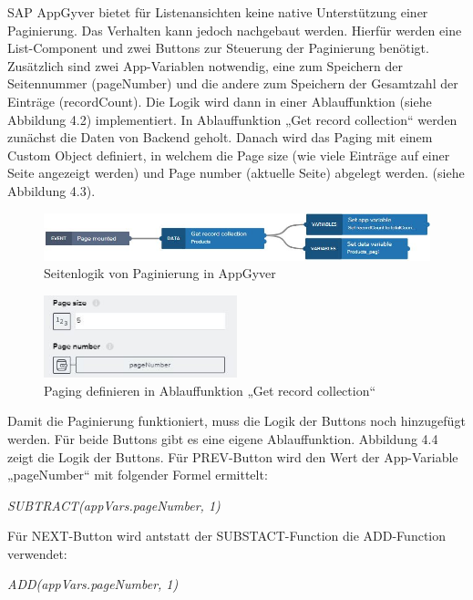 SAP AppGyver bietet für Listenansichten keine native Unterstützung einer Paginierung. Das Verhalten kann jedoch nachgebaut werden. Hierfür werden eine List-Component und zwei Buttons zur Steuerung der Paginierung benötigt. Zusätzlich sind zwei App-Variablen notwendig, eine zum Speichern der Seitennummer (pageNumber) und die andere zum Speichern der Gesamtzahl der Einträge (recordCount). Die Logik wird dann in einer Ablauffunktion (siehe Abbildung 4.2) implementiert. In Ablauffunktion „Get record collection“ werden zunächst die Daten von Backend geholt. Danach wird das Paging mit einem Custom Object definiert, in welchem die Page size (wie viele Einträge auf einer Seite angezeigt werden) und Page number  (aktuelle Seite) abgelegt werden. (siehe Abbildung 4.3).

\begin{figure}[htbp]
 \centering
 \includegraphics[width=1.0\textwidth]{Bilder/appgyver/4_2_Seitenlogic paginierung.jpg}
 \caption{Seitenlogik von Paginierung in AppGyver}
\end{figure}
 
\begin{figure}[htbp]
 \centering
 \includegraphics[width=0.5\textwidth]{Bilder/appgyver/4_3_Paging_definieren.jpg}
 \caption{Paging definieren in Ablauffunktion „Get record collection“}
\end{figure}

Damit die Paginierung funktioniert, muss die Logik der Buttons noch hinzugefügt werden. Für beide Buttons gibt es eine eigene Ablauffunktion. Abbildung 4.4 zeigt die Logik der Buttons. Für PREV-Button wird den Wert der App-Variable „pageNumber“ mit folgender Formel ermittelt: 

\textit{\footnotesize SUBTRACT(appVars.pageNumber, 1)} 

Für NEXT-Button wird antstatt der SUBSTACT-Function die ADD-Function verwendet: 

\textit{\footnotesize ADD(appVars.pageNumber, 1)}


